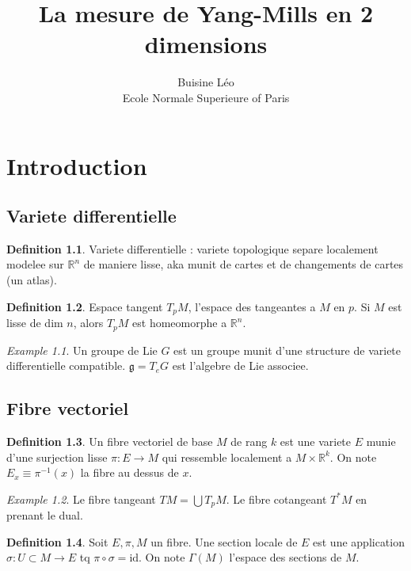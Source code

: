 \documentclass[a4paper]{report}
\theoremstyle{definition}
\newtheorem{definition}{Definition}[section]
\theoremstyle{remark}
\newtheorem*{example}{Example}
\begin{document}
\title{La mesure de Yang-Mills en 2 dimensions}
\author{Buisine Léo\\Ecole Normale Superieure of Paris}
\maketitle

\tableofcontents

\chapter{Introduction}
\section{Variete differentielle}
\begin{definition}
    Variete differentielle : variete topologique separe localement modelee sur $\mathbb{R}^n$ de maniere lisse, aka munit de cartes et de changements de cartes (un atlas).
\end{definition}
\begin{definition}
    Espace tangent $T_pM$, l'espace des tangeantes a $M$ en $p$. Si $M$ est lisse de dim $n$, alors $T_pM$ est homeomorphe a $\mathbb{R}^n$.
\end{definition}

\begin{example}
    Un groupe de Lie $G$ est un groupe munit d'une structure de variete differentielle compatible. $\mathfrak{g} = T_eG$ est l'algebre de Lie associee. 
\end{example}

\section{Fibre vectoriel}
\begin{definition}
    Un fibre vectoriel de base $M$ de rang $k$ est une variete $E$ munie d'une surjection lisse $\pi : E\rightarrow M$ qui ressemble localement a $M \times \mathbb{R}^k$. On note $E_x \equiv \pi^{-1}(x)$ la fibre au dessus de $x$. 
\end{definition}

\begin{example}
    Le fibre tangeant $TM = \bigcup T_p M$. Le fibre cotangeant $T^*M$ en prenant le dual. 
\end{example}

\begin{definition}
    Soit $E, \pi, M$ un fibre. Une section locale de $E$ est une application $\sigma: U \subset M \rightarrow E$ tq $\pi \circ \sigma = \text{id}$. On note $\Gamma(M)$ l'espace des sections de $M$. 
\end{definition}
\end{document}
